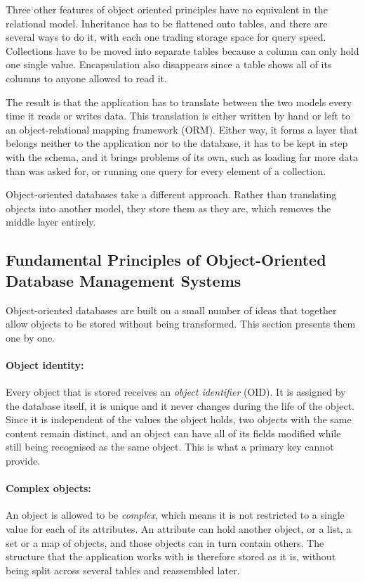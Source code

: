 \documentclass{article}
\begin{document}
Three other features of object oriented principles have no equivalent in the relational model. Inheritance has to be flattened onto tables, and there are several ways to do it, with each one trading storage space for query speed.
Collections have to be moved into separate tables because a column can only hold one single value.
Encapsulation also disappears since a table shows all of its columns to anyone allowed to read it.

The result is that the application has to translate between the two models every time it reads or writes data. This translation is either written by hand or left to an object-relational mapping framework (ORM). Either way, it forms a layer that belongs neither to the application nor to the database, it has to be kept in step with the schema, and it brings problems of its own, such as loading far more data than was asked for, or running one query for every element of a collection.

Object-oriented databases take a different approach. Rather than translating objects into another model, they store them as they are, which removes the middle layer entirely.

\subsection{Fundamental Principles of Object-Oriented Database Management Systems}
\label{subsec:principles}

Object-oriented databases are built on a small number of ideas that together
allow objects to be stored without being transformed. This section presents them
one by one.

\paragraph{Object identity:} Every object that is stored receives an \emph{object
identifier} (OID). It is assigned by the database itself, it is unique and it
never changes during the life of the object. Since it is independent of the
values the object holds, two objects with the same content remain distinct, and
an object can have all of its fields modified while still being recognised as the
same object. This is what a primary key cannot provide.

\paragraph{Complex objects:} An object is allowed to be \emph{complex}, which
means it is not restricted to a single value for each of its attributes. An
attribute can hold another object, or a list, a set or a map of objects, and
those objects can in turn contain others. The structure that the application
works with is therefore stored as it is, without being split across several
tables and reassembled later.
\end{document}
